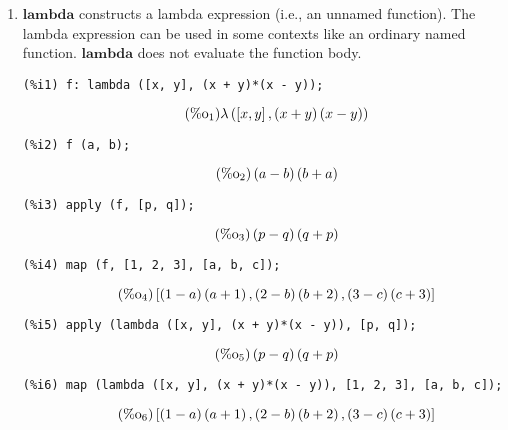 \documentclass[12pt,leqno]{article}
\begin{document}
\begin{enumerate}
\item $\mathbf{lambda}$ constructs a lambda expression (i.e., an unnamed function).
The lambda expression can be used in some contexts like an ordinary named function.
$\mathbf{lambda}$ does not evaluate the function body.
\begin{verbatim}
(%i1) f: lambda ([x, y], (x + y)*(x - y));
\end{verbatim}
\begin{equation}
\tag{$\mathop{\mathrm{\%o}_{1}}$}\lambda\left(\left[x, y\right], \left(x+y\right) \left(x-y\right)\right)
\label{eq:doc-group1-code25-1-1}
\end{equation}
\begin{verbatim}
(%i2) f (a, b);
\end{verbatim}
\begin{equation}
\tag{$\mathop{\mathrm{\%o}_{2}}$}\left(a-b\right) \left(b+a\right)
\label{eq:doc-group1-code25-2-1}
\end{equation}
\begin{verbatim}
(%i3) apply (f, [p, q]);
\end{verbatim}
\begin{equation}
\tag{$\mathop{\mathrm{\%o}_{3}}$}\left(p-q\right) \left(q+p\right)
\label{eq:doc-group1-code25-3-1}
\end{equation}
\begin{verbatim}
(%i4) map (f, [1, 2, 3], [a, b, c]);
\end{verbatim}
\begin{equation}
\tag{$\mathop{\mathrm{\%o}_{4}}$}\left[\left(1-a\right) \left(a+1\right), \left(2-b\right) \left(b+2\right), \left(3-c\right) \left(c+3\right)\right]
\label{eq:doc-group1-code25-4-1}
\end{equation}
\begin{verbatim}
(%i5) apply (lambda ([x, y], (x + y)*(x - y)), [p, q]);
\end{verbatim}
\begin{equation}
\tag{$\mathop{\mathrm{\%o}_{5}}$}\left(p-q\right) \left(q+p\right)
\label{eq:doc-group1-code25-5-1}
\end{equation}
\begin{verbatim}
(%i6) map (lambda ([x, y], (x + y)*(x - y)), [1, 2, 3], [a, b, c]);
\end{verbatim}
\begin{equation}
\tag{$\mathop{\mathrm{\%o}_{6}}$}\left[\left(1-a\right) \left(a+1\right), \left(2-b\right) \left(b+2\right), \left(3-c\right) \left(c+3\right)\right]
\label{eq:doc-group1-code25-6-1}
\end{equation}


\end{enumerate}
\end{document}
